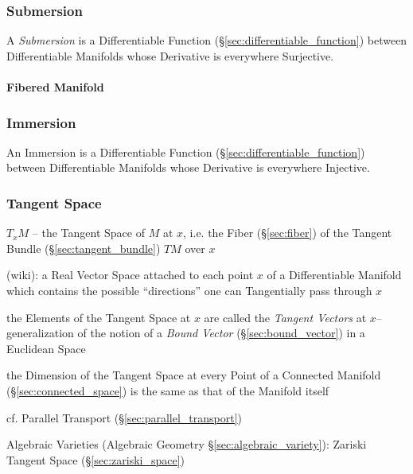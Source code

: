 \subsubsection{Submersion}\label{sec:submersion}

A \emph{Submersion} is a Differentiable Function
(\S\ref{sec:differentiable_function}) between Differentiable Manifolds
whose Derivative is everywhere Surjective.



\paragraph{Fibered Manifold}\label{sec:fibered_manifold}\hfill



\subsubsection{Immersion}\label{sec:immersion}

An Immersion is a Differentiable Function
(\S\ref{sec:differentiable_function}) between Differentiable Manifolds
whose Derivative is everywhere Injective.



\subsubsection{Tangent Space}\label{sec:tangent_space}

$T_x M$ -- the Tangent Space of $M$ at $x$, i.e. the Fiber (\S\ref{sec:fiber})
of the Tangent Bundle (\S\ref{sec:tangent_bundle}) $T M$ over $x$

(wiki): a Real Vector Space attached to each point $x$ of a Differentiable
Manifold which contains the possible ``directions'' one can Tangentially pass
through $x$

the Elements of the Tangent Space at $x$ are called the \emph{Tangent Vectors}
at $x$-- generalization of the notion of a \emph{Bound Vector}
(\S\ref{sec:bound_vector}) in a Euclidean Space

the Dimension of the Tangent Space at every Point of a Connected Manifold
(\S\ref{sec:connected_space}) is the same as that of the Manifold itself

\fist cf. Parallel Transport (\S\ref{sec:parallel_transport})

\fist Algebraic Varieties (Algebraic Geometry \S\ref{sec:algebraic_variety}):
Zariski Tangent Space (\S\ref{sec:zariski_space})

